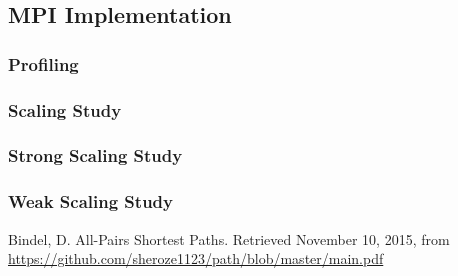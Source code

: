 \documentclass[11pt]{article}
\begin{document}
\subsection{MPI Implementation}
\subsubsection{Profiling} \label{sec:prof}
\subsubsection{Scaling Study} \label{sec:speedup}
\subsubsection{Strong Scaling Study}
\subsubsection{Weak Scaling Study}


\begin{thebibliography}{9}
Bindel, D. All-Pairs Shortest Paths. Retrieved November 10, 2015, from \url{https://github.com/sheroze1123/path/blob/master/main.pdf}

\end{thebibliography}

 
 
\end{document}
